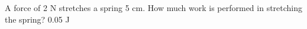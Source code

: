 {A force of 2 N stretches a spring 5 cm. How much work is performed in stretching the spring?}
{0.05 J
}

